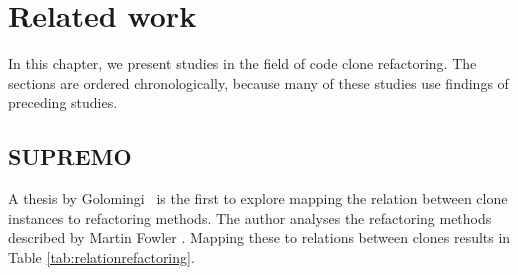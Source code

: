 \chapter{Related work} \label{ch:related_work}
In this chapter, we present studies in the field of code clone refactoring. The sections are ordered chronologically, because many of these studies use findings of preceding studies.

\section{SUPREMO}
A thesis by Golomingi~\cite{koni2001scenario} is the first to explore mapping the relation between clone instances to refactoring methods. The author analyses the refactoring methods described by Martin Fowler \cite{fowler1999refactoring}. Mapping these to relations between clones results in Table \ref{tab:relationrefactoring}.

